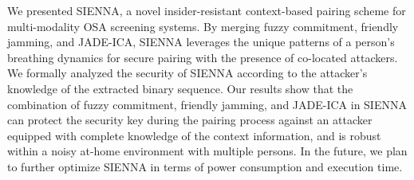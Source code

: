 We presented SIENNA, a novel insider-resistant context-based pairing scheme for multi-modality OSA screening systems. By merging fuzzy commitment, friendly jamming, and JADE-ICA, SIENNA leverages the unique patterns of a person's breathing dynamics for secure pairing with the presence of co-located attackers. We formally analyzed the security of SIENNA according to the attacker's knowledge of the extracted binary sequence. Our results show that the combination of fuzzy commitment, friendly jamming, and JADE-ICA in SIENNA can protect the security key during the pairing process against an attacker equipped with complete knowledge of the context information, and is robust within a noisy at-home environment with multiple persons. In the future, we plan to further optimize SIENNA in terms of power consumption and execution time.